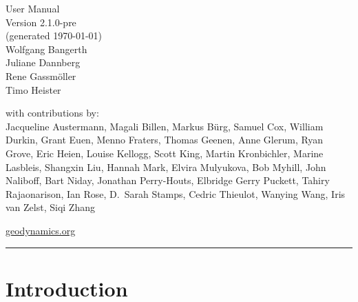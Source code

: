 \documentclass{article}
\begin{document}
{%
\color{dark_grey}
\hfill{\Huge \fontfamily{\sfdefault}\selectfont User Manual \\
\raggedleft \huge \fontfamily{\sfdefault}\selectfont Version
2.1.0-pre %
\\\large(generated \today)\\
{\Large Wolfgang Bangerth\\Juliane Dannberg\\Rene Gassm{\"o}ller\\Timo Heister\\}
}

\null
\vspace{17em}
\color{dark_grey}
{\fontfamily{\sfdefault}\selectfont
\large
\noindent with contributions by: \\
    Jacqueline Austermann,
    Magali Billen,
    Markus B{\"u}rg,
    Samuel Cox,
    William Durkin,
    Grant Euen,
    Menno Fraters,
    Thomas Geenen,
    Anne Glerum,
    Ryan Grove,
    Eric Heien,
    Louise Kellogg,
    Scott King,
    Martin Kronbichler,
    Marine Lasbleis,
    Shangxin Liu,
    Hannah Mark,
    Elvira Mulyukova,
    Bob Myhill,
    John Naliboff,
    Bart Niday,
    Jonathan Perry-Houts,
    Elbridge Gerry Puckett,
    Tahiry Rajaonarison,
    Ian Rose,
    D.~Sarah Stamps,
    Cedric Thieulot,
    Wanying Wang, 
    Iris van Zelst,
    Siqi Zhang \\
\vspace{1.0em}
}

{\noindent
{\fontfamily{\sfdefault}\selectfont \href{https://geodynamics.org}{geodynamics.org}}
}

{\noindent
\color{dark_grey}
\rule{\textwidth}{2pt}
}

}

\pagebreak
{}


\pagebreak

\tableofcontents

\pagebreak

\section{Introduction}
\end{document}
